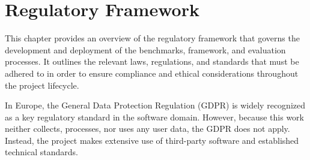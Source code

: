 \chapter{Regulatory Framework}\label{chap:regulation}

This chapter provides an overview of the regulatory framework that governs the development and deployment of the benchmarks, framework, and evaluation processes. It outlines the relevant laws, regulations, and standards that must be adhered to in order to ensure compliance and ethical considerations throughout the project lifecycle.

In Europe, the General Data Protection Regulation (GDPR) \cite{gdpr} is widely recognized as a key regulatory standard in the software domain. However, because this work neither collects, processes, nor uses any user data, the GDPR does not apply. Instead, the project makes extensive use of third-party software and established technical standards.

